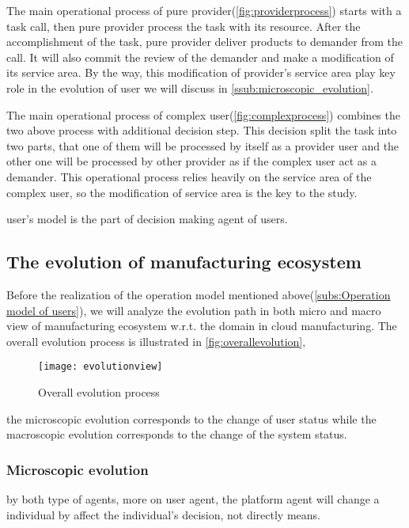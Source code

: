 The main operational process of pure provider(\autoref{fig:providerprocess}) starts with a task call, then pure provider process the task with its resource. After the accomplishment of the task, pure provider deliver products to demander from the call. It will also commit the review of the demander and make a modification of its service area. By the way, this modification of provider's service area play key role in the evolution of user we will discuss in \autoref{ssub:microscopic_evolution}.  

The main operational process of complex user(\autoref{fig:complexprocess}) combines the two above process with additional decision step. This decision split the task into two parts, that one of them will be processed by itself as a provider user and the other one will be processed by other provider as if the complex user act as a demander. This operational process relies heavily on the service area of the complex user, so the modification of service area is the key to the study.

user's model is the part of decision making agent of users.



\subsection{The evolution of manufacturing ecosystem} %
\label{sub:the_evolution_of_manufacturing_ecosystem}
Before the realization of the operation model mentioned above(\autoref{subs:Operation model of users}), we will analyze the evolution path in both micro and macro view of manufacturing ecosystem w.r.t. the domain in cloud manufacturing. The overall evolution process is illustrated in \autoref{fig:overallevolution},
\begin{figure}[htbp]
	\centering
	\texttt{[image: evolutionview]}
	\caption{Overall evolution process}
	\label{fig:overallevolution}
\end{figure}
the microscopic evolution corresponds to the change of user status while the macroscopic evolution corresponds to the change of the system status.

\subsubsection{Microscopic evolution} %
\label{ssub:microscopic_evolution}

by both type of agents, more on user agent, the platform agent will change a individual by affect the individual's decision, not directly means.

